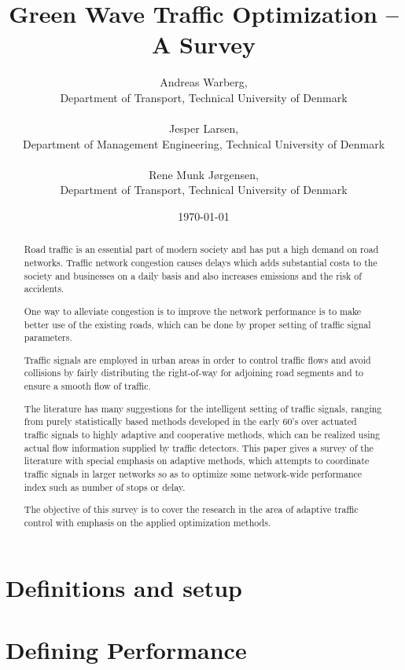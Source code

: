 \documentclass [a4paper, 10pt]{article}
\title{Green Wave Traffic Optimization -- A Survey}
\author{Andreas Warberg,\\ Department of Transport, Technical University of Denmark\\ ~ \\ 
Jesper Larsen,\\ Department of Management Engineering, Technical University of Denmark\\ ~ \\ Rene Munk J{\o}rgensen,\\ Department of Transport, Technical University of Denmark}
\date{\today}
\begin{document}
\setlength{\parindent}{4mm}

\maketitle

\begin{abstract}

Road traffic is an essential part of modern society and has put a high
demand on road networks. Traffic network congestion causes delays
which adds substantial costs to the society and businesses on a daily
basis and also increases emissions and the risk of accidents.

One way to alleviate congestion is to improve the network performance
is to make better use of the existing roads, which can be done by
proper setting of traffic signal parameters.

Traffic signals are employed in urban areas in order to control
traffic flows and avoid collisions by fairly distributing the
right-of-way for adjoining road segments and to ensure a smooth flow
of traffic.


The literature has many suggestions for the intelligent setting of
traffic signals, ranging from purely statistically based methods
developed in the early 60's over actuated traffic signals to highly
adaptive and cooperative methods, which can be realized using actual
flow information supplied by traffic detectors. This paper gives a
survey of the literature with special emphasis on adaptive methods,
which attempts to coordinate traffic signals in larger networks so as
to optimize some network-wide performance index such as number of
stops or delay.

The objective of this survey is to cover the research in the area of
adaptive traffic control with emphasis on the applied optimization
methods.
\end{abstract}



\section{Definitions and setup}


%

\section{Defining Performance}

\end{document}
